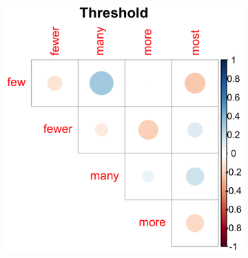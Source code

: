 \documentclass{article}
\begin{document}
\iffalse
\begin{figure} [H]
   \begin{minipage}[t]{\textwidth}
   \begin{minipage}[t]{0.49\textwidth}
    \begin{subfigure}[t]{\linewidth}
     \includegraphics[width=\linewidth]{Figure2.3a.png}
     \caption{\label{fig:fig2.3a}}
    \end{subfigure}


\end{minipage}
\end{minipage}
\end{figure}
\end{document}
